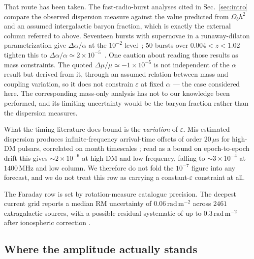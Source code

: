 \documentclass[aps,prd,twocolumn,superscriptaddress,nofootinbib,10pt]{revtex4-2}
\begin{document}
That route has been taken. The fast-radio-burst analyses cited in Sec.~\ref{sec:intro} compare the
observed dispersion measure against the value predicted from $\Omega_b h^{2}$ and an assumed
intergalactic baryon fraction, which is exactly the external column referred to above. Seventeen
bursts with supernovae in a runaway-dilaton parametrization give $\Delta\alpha/\alpha$ at the
$10^{-2}$ level~\cite{Lemos2025}; 50 bursts over $0.004 < z < 1.02$ tighten this to
$\Delta\alpha/\alpha \simeq 2 \times 10^{-5}$~\cite{Kalita2024}. One caution about reading those
results as mass constraints. The quoted $\Delta\mu/\mu \simeq -1 \times 10^{-5}$ is not independent
of the $\alpha$ result but derived from it, through an assumed relation between mass and coupling
variation, so it does not constrain $\varepsilon$ at fixed $\alpha$ --- the case considered here.
The corresponding mass-only analysis has not to our knowledge been performed, and its limiting
uncertainty would be the baryon fraction rather than the dispersion measures.

What the timing literature does bound is the \emph{variation} of $\varepsilon$. Mis-estimated
dispersion produces infinite-frequency arrival-time offsets of order $20\,\mu\mathrm{s}$ for
high-DM pulsars, correlated on month timescales
\citep{JonesNANOGrav2017,NANOGravDM2023}; read as a bound on epoch-to-epoch drift this gives
$\sim\!2\times10^{-6}$ at high DM and low frequency, falling to $\sim\!3\times10^{-4}$ at
$1400\,\mathrm{MHz}$ and low column. We therefore do not fold the $10^{-7}$ figure into any
forecast, and we do not treat this row as carrying a constant-$\varepsilon$ constraint at all.

The Faraday row is set by rotation-measure catalogue precision. The deepest current grid reports a
median RM uncertainty of $0.06\,\mathrm{rad\,m^{-2}}$ across $2461$ extragalactic sources, with a
possible residual systematic of up to $0.3\,\mathrm{rad\,m^{-2}}$ after ionospheric correction
\citep{OSullivanLoTSS2023}.

\subsection{Where the amplitude actually stands}
\end{document}
